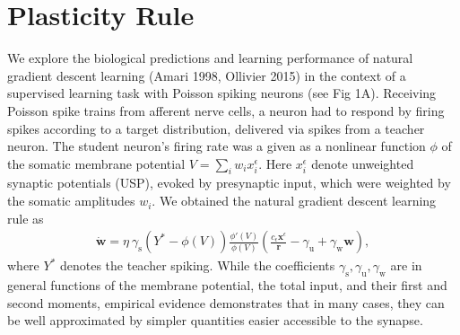 \documentclass[twocolumn,12pt]{article}
\newcommand{\lb}{\left}
\newcommand{\mb}{\mathbf}
\newcommand{\mrm}{\mathrm}
\newcommand{\rb}{\right}
\newcommand{\xeps}{\mathbf x^{\epsilon}}
\begin{document}
\section*{Plasticity Rule}
\vspace*{-0.3cm}
We explore the biological predictions and learning performance of natural gradient descent learning (Amari 1998, Ollivier 2015) in the context of a supervised learning task with Poisson spiking neurons (see Fig 1A). Receiving Poisson spike trains from afferent nerve cells, a neuron had to respond by firing spikes according to a target distribution, delivered via spikes from a teacher neuron. The student neuron's firing rate was a given as a nonlinear function $\phi$ of the somatic membrane potential $V=\sum_i w_i x_i^{\epsilon}$. Here  $x_i^{\epsilon}$ denote unweighted synaptic potentials (USP), evoked by presynaptic input, which were weighted by the somatic amplitudes $w_i$. We obtained the natural gradient descent learning rule as 
\begin{eqnarray}
\label{Results_Natural_Gradient}
\dot{\mb w} =\eta \ \gamma_{\mrm s} \lb(Y^*-\phi(V)\rb) \frac{\phi'(V)}{\phi(V)}\lb(\frac{c_{\epsilon}\xeps}{\mb r}-\gamma_{\mrm u}+\gamma_{\mrm w}{\mb w}\rb),
\end{eqnarray} 
where $Y^*$ denotes the teacher spiking. While the coefficients $\gamma_{\mrm s},\gamma_{\mrm u},\gamma_{\mrm w}$ are in general functions of the membrane potential, the total input, and their first and second moments, empirical evidence demonstrates that in many cases, they can be well approximated by simpler quantities easier accessible to the synapse.
\vspace*{-0.7cm} 
\end{document}
